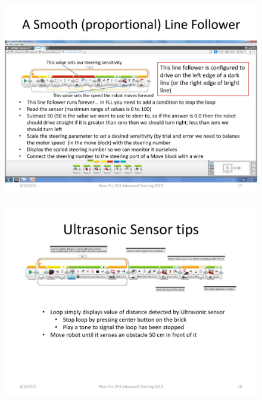 \documentclass[11pt]{beamer}
\begin{document}
\begin{frame}
\begin{figure}
\includegraphics[scale=0.4]{ev3advanced2015/file-page17}
\end{figure}
\end{frame}


\begin{frame}
\begin{figure}
\includegraphics[scale=0.4]{ev3advanced2015/file-page18}
\end{figure}
\end{frame}
\end{document}
